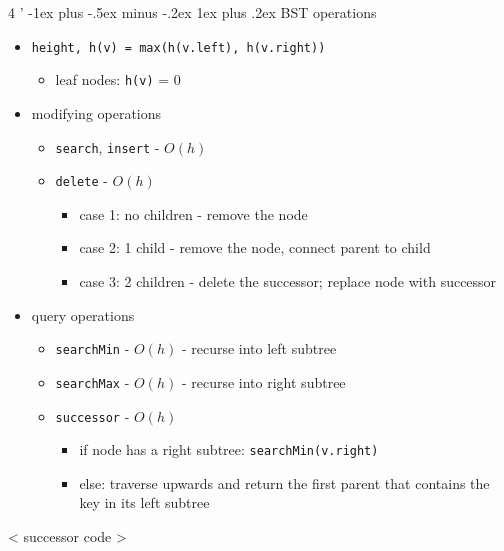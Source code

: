 \documentclass[10pt, landscape]{article}
\makeatletter
\renewcommand{\subsubsection}{\@startsection{subsubsection}{3}{0mm}%
                                {-1ex plus -.5ex minus -.2ex}%
                                {1ex plus .2ex}%
                                {\normalfont\small\bfseries}}%
\newcommand{\code}[1]{\textcolor{myblue}{\texttt{#1}}}
\makeatother
\begin{document}
\begin{multicols}{4
    '}
\subsubsection{BST operations}
\begin{itemize}
    \item \code{height, h(v) = max(h(v.left), h(v.right))}
    \begin{itemize}
        \item leaf nodes: \code{h(v)} = 0 
    \end{itemize}
    \item modifying operations
    \begin{itemize}
        \item \code{search}, \code{insert} - $O(h)$
        \item \code{delete} - $O(h)$
        \begin{itemize}
            \item case 1: no children - remove the node
            \item case 2: 1 child - remove the node, connect parent to child
            \item case 3: 2 children - delete the successor; replace node with successor
        \end{itemize}
    \end{itemize}
    \item query operations
    \begin{itemize}
        \item \code{searchMin} - $O(h)$ - recurse into left subtree
        \item \code{searchMax} - $O(h)$ - recurse into right subtree
        \item \code{successor} - $O(h)$
        \begin{itemize}
            \item if node has a right subtree: \code{searchMin(v.right)}
            \item else: traverse upwards and return the first parent that contains the key in its left subtree
        \end{itemize}
    \end{itemize}
\end{itemize}
\begin{center}
    < successor code >
\end{center}


\end{multicols}
\end{document}
